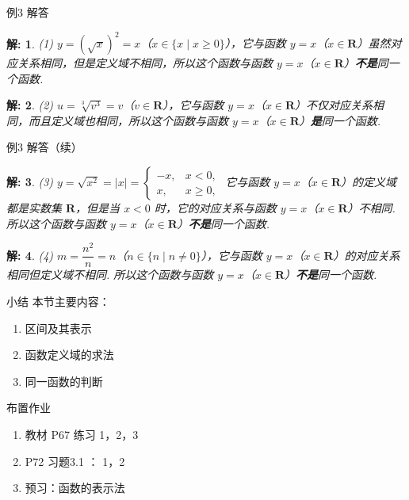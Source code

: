 \documentclass[aspectratio=169,13pt,t] {beamer}
\newtheorem*{solve}{解:}
\theoremstyle{definition}
\begin{document}
\begin{frame}{例3 解答}
	\begin{solve}
		(1) \(y = (\sqrt{x})^2 = x\)（\(x \in \{x \mid x \geqslant 0\}\)），它与函数 \(y = x\)（\(x \in \mathbf{R}\)）虽然对应关系相同，但是定义域不相同，所以这个函数与函数 \(y = x\)（\(x \in \mathbf{R}\)）\textbf{不是}同一个函数.
	\end{solve}
	\pause
	\begin{solve}
		(2) \(u = \sqrt[3]{v^3} = v\)（\(v \in \mathbf{R}\)），它与函数 \(y = x\)（\(x \in \mathbf{R}\)）不仅对应关系相同，而且定义域也相同，所以这个函数与函数 \(y = x\)（\(x \in \mathbf{R}\)）\textbf{是}同一个函数.
	\end{solve}
\end{frame}

\begin{frame}{例3 解答（续）}
	\begin{solve}
		(3) \(y = \sqrt{x^2} = |x| = \begin{cases} -x, & x < 0, \\ x, & x \geqslant 0, \end{cases}\) 它与函数 \(y = x\)（\(x \in \mathbf{R}\)）的定义域都是实数集 \(\mathbf{R}\)，但是当 \(x < 0\) 时，它的对应关系与函数 \(y = x\)（\(x \in \mathbf{R}\)）不相同. 所以这个函数与函数 \(y = x\)（\(x \in \mathbf{R}\)）\textbf{不是}同一个函数.
	\end{solve}
	\pause
	\begin{solve}
		(4) \(m = \dfrac{n^2}{n} = n\)（\(n \in \{n \mid n \neq 0\}\)），它与函数 \(y = x\)（\(x \in \mathbf{R}\)）的对应关系相同但定义域不相同. 所以这个函数与函数 \(y = x\)（\(x \in \mathbf{R}\)）\textbf{不是}同一个函数.
	\end{solve}
\end{frame}

\begin{frame}{小结}
	本节主要内容：
	\begin{enumerate}[(1)]
		\item<2-> 区间及其表示
		\item<3-> 函数定义域的求法
		\item<4-> 同一函数的判断
	\end{enumerate}
\end{frame}

\begin{frame}{布置作业}
	\begin{summarybox}[课后作业]
		\begin{enumerate}
			\item 教材 P67 练习 1，2，3
			\item P72 习题3.1 ： 1，2
			\item 预习：函数的表示法
		\end{enumerate}
	\end{summarybox}
\end{frame}
\end{document}
